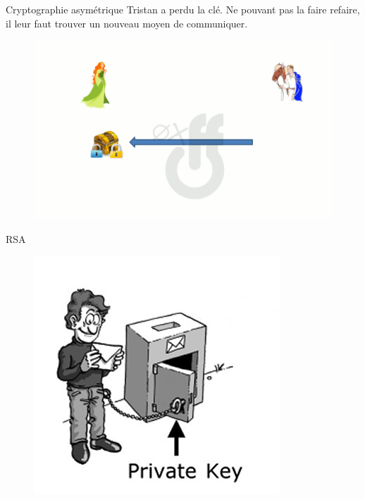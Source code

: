\documentclass{beamer}
\begin{document}
\begin{frame}{Cryptographie asymétrique}
  Tristan a perdu la clé. Ne pouvant pas la faire refaire, il leur faut trouver un nouveau moyen de communiquer.
      \begin{figure}
    \centering
    \includegraphics[scale = 0.3]{tmp-7.png}
  \end{figure}
      \end{frame}

\begin{frame}{RSA}
    \begin{figure}
    \centering
    \includegraphics[scale = 0.5]{Public_Key.png}
  \end{figure}
  \end{frame}
\end{document}
